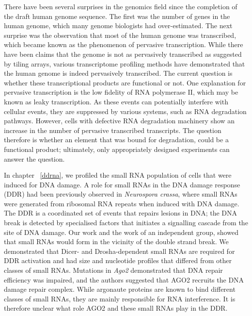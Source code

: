 There have been several surprises in the genomics field since the completion of the draft human genome sequence\cite{lander2001initial,venter2001sequence}. The first was the number of genes in the human genome, which many genome biologists had over-estimated\cite{genesweep}. The next surprise was the observation that most of the human genome was transcribed\cite{pmid11988577, pmid17571346}, which became known as the phenomenon of pervasive transcription. While there have been claims that the genome is not as pervasively transcribed as suggested by tiling arrays\cite{pmid20502517}, various transcriptome profiling methods have demonstrated that the human genome is indeed pervasively transcribed\cite{pmid22955620}. The current question is whether these transcriptional products are functional or not. One explanation for pervasive transcription is the low fidelity of RNA polymerase II\cite{pmid17277804}, which may be known as leaky transcription. As these events can potentially interfere with cellular events, they are suppressed by various systems, such as RNA degradation pathways. However, cells with defective RNA degradation machinery show an increase in the number of pervasive transcribed transcripts\cite{pmid24267449}. The question therefore is whether an element that was bound for degradation, could be a functional product; ultimately, only appropriately designed experiments can answer the question.

In chapter ~\ref{ddrna}, we profiled the small RNA population of cells that were induced for DNA damage. A role for small RNAs in the DNA damage response (DDR) had been previously observed in \textit{Neurospora crassa}, where small RNAs were generated from ribosomal RNA repeats when induced with DNA damage\cite{pmid19444217}. The DDR is a coordinated set of events that repairs lesions in DNA; the DNA break is detected by specialised factors that initiates a signalling cascade from the site of DNA damage\cite{pmid19847258}. Our work and the work of an independent group, showed that small RNAs would form in the vicinity of the double strand break\cite{francia2012site,pmid22445173}. We demonstrated that Dicer- and Drosha-dependent small RNAs are required for DDR activation and had size and nucleotide profiles that differed from other classes of small RNAs. Mutations in \textit{Ago2} demonstrated that DNA repair efficiency was impaired\cite{pmid22445173}, and the authors suggested that AGO2 recruits the DNA damage repair complex. While argonaute proteins are known to bind different classes of small RNAs, they are mainly responsible for RNA interference. It is therefore unclear what role AGO2 and these small RNAs play in the DDR.

